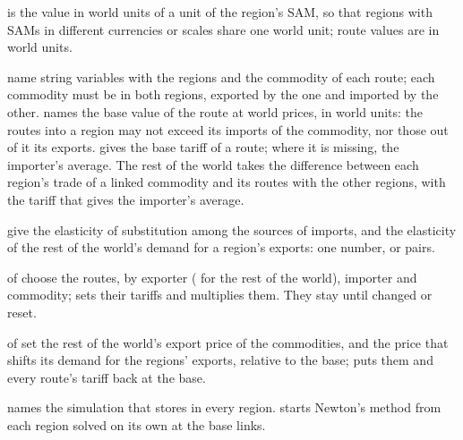 \begin{optdesc}
\item[\optarg{un}{its}{\#}] is the value in world units of a unit of the
region's SAM, so that regions with SAMs in different currencies or scales
share one world unit; route values are in world units.

\item[\optarg{exp}{orter}{varname} \optarg{imp}{orter}{varname}
\optarg{com}{modity}{varname}] name string variables with the regions and the
commodity of each route; each commodity must be in both regions, exported by
the one and imported by the other.  names the base
value of the route at world prices, in world units: the routes into a region
may not exceed its imports of the commodity, nor those out of it its exports.
 gives the base tariff of a route; where it is
missing, the importer's average. The rest of the world takes the difference
between each region's trade of a linked commodity and its routes with the
other regions, with the tariff that gives the importer's average.

\item[\optarg{sig}{ma}{spec} \optarg{row}{elasticity}{spec}] give the elasticity
of substitution among the sources of imports, and the elasticity of the rest
of the world's demand for a region's exports: one number, or
\cmd{:}\argu{\#} pairs.

\item[\optarg{}{from}{regions} \optarg{}{to}{regions}
\optarg{com}{modities}{list}] of  choose the routes,
by exporter ( for the rest of the world), importer and commodity;
 sets their tariffs and  multiplies
them. They stay until changed or reset.

\item[\optarg{imp}{ort}{\#} \optarg{exp}{ort}{\#}] of 
set the rest of the world's export price of the commodities, and the price
that shifts its demand for the regions' exports, relative to the base;
 puts them and every route's tariff back at the base.

\item[\optarg{}{name}{name}] names the simulation that 
stores in every region.  starts Newton's method from
each region solved on its own at the base links.
\end{optdesc}

